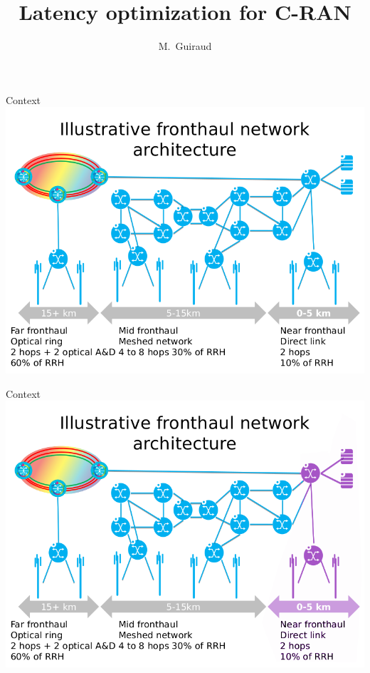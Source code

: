 \documentclass{beamer}
\title{Latency optimization for C-RAN}
\author{M.~Guiraud }
\institute[Nokia Bell Labs, UVSQ] 
{
  Nokia Bell Labs France - 
  Universit\'e de Versailles Saint Quentin\\
}
\begin{document}
\begin{frame}

  \titlepage
  
\end{frame}


\begin{frame}{Context}
  \centering
  \includegraphics[scale=0.38]{fronthaul0.png}
\end{frame}

\begin{frame}{Context}
  \centering
  \includegraphics[scale=0.38]{fronthaul.png}
\end{frame}
\end{document}
